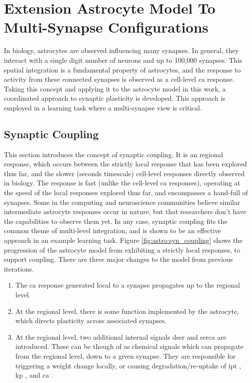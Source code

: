 \documentclass[conference]{IEEEtran}
\newcommand{\ca}{\gls{ca}\textrm{ }}
\newcommand{\ipt}{\gls{ipt}\textrm{ }}
\newcommand{\kp}{\gls{kp}\textrm{ }}
\newcommand{\dser}{\gls{dser}\textrm{ }}
\newcommand{\serca}{\gls{serca}\textrm{ }}
\begin{document}
\section{Extension Astrocyte Model To Multi-Synapse Configurations}

In biology, astrocytes are observed influencing many synapses. In general, they
interact with a single digit number of neurons and up to 100,000 synapses. This
spatial integration is a fundamental property of astrocytes, and the response to
activity from these connected synapses is observed as a cell-level \ca
response. Taking this concept and applying it to the astrocyte model in this
work, a coordinated approach to synaptic plasticity is developed. This approach
is employed in a learning task where a multi-synapse view is critical.

\subsection{Synaptic Coupling}
This section introduces the concept of synaptic coupling. It is an regional
response, which occurs between the strictly local response that has been
explored thus far, and the slower (seconds timescale) cell-level responses
directly observed in biology. The response is fast (unlike the cell-level \ca
responses), operating at the speed of the local responses explored thus far, and
encompasses a hand-full of synapses. Some in the computing and neuroscience
communities believe similar intermediate astrocyte responses occur in nature,
but that researchers don't have the capabilities to observe them yet. In any
case, synaptic coupling fits the common theme of multi-level integration, and is
shown to be an effective approach in an example learning task. Figure
\ref{fig:astro:syn_coupling} shows the progression of the astrocyte model from
exhibiting a strictly local responses, to support coupling. There are three
major changes to the model from previous iterations.

\begin{enumerate}
\item The \ca response generated local to a synapse propagates up to the
  regional level.
\item At the regional level, there is some function implemented by the
  astrocyte, which directs plasticity across associated synapses.
\item At the regional level, two additional internal signals \dser and
  \serca are introduced. These can be though of as chemical signals which can
  propagate from the regional level, down to a given synapse. They are
  responsible for triggering a weight change locally, or causing
  degradation/re-uptake of \ipt, \kp, and \ca.
\end{enumerate}
\end{document}
